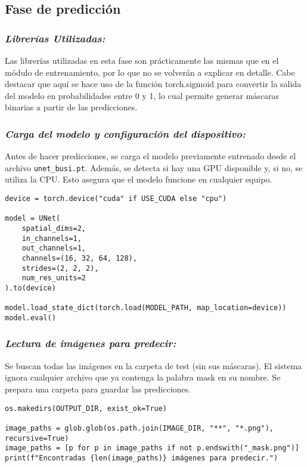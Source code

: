 \documentclass[12pt]{article}
\begin{document}
\subsection{Fase de predicción}
\subsubsection{\textit{Librerías Utilizadas:}}
Las librerías utilizadas en esta fase son prácticamente las mismas que en el módulo de entrenamiento, por lo que no se volverán a explicar en detalle.
Cabe destacar que aquí se hace uso de la función torch.sigmoid para convertir la salida del modelo en probabilidades entre 0 y 1, lo cual permite generar máscaras binarias a partir de las predicciones.

\subsubsection{\textit{Carga del modelo y configuración del dispositivo:}}
Antes de hacer predicciones, se carga el modelo previamente entrenado desde el archivo \texttt{unet\_busi.pt}. Además, se detecta si hay una GPU disponible y, si no, se utiliza la CPU. Esto asegura que el modelo funcione en cualquier equipo.
\begin{lstlisting}[caption={Carga del modelo y selección de dispositivo}, label=lst:predict_device_model]
device = torch.device("cuda" if USE_CUDA else "cpu")

model = UNet(
    spatial_dims=2,
    in_channels=1,
    out_channels=1,
    channels=(16, 32, 64, 128),
    strides=(2, 2, 2),
    num_res_units=2
).to(device)

model.load_state_dict(torch.load(MODEL_PATH, map_location=device))
model.eval()
\end{lstlisting}
\subsubsection{\textit{Lectura de imágenes para predecir:}}
Se buscan todas las imágenes en la carpeta de test (sin sus máscaras).
El sistema ignora cualquier archivo que ya contenga la palabra mask en su nombre.
Se prepara una carpeta para guardar las predicciones.
\begin{lstlisting}[caption={Búsqueda de imágenes nuevas para predecir}, label=lst:predict_images_input]
os.makedirs(OUTPUT_DIR, exist_ok=True)

image_paths = glob.glob(os.path.join(IMAGE_DIR, "**", "*.png"), recursive=True)
image_paths = [p for p in image_paths if not p.endswith("_mask.png")]
print(f"Encontradas {len(image_paths)} imágenes para predecir.")
\end{lstlisting}
\end{document}

